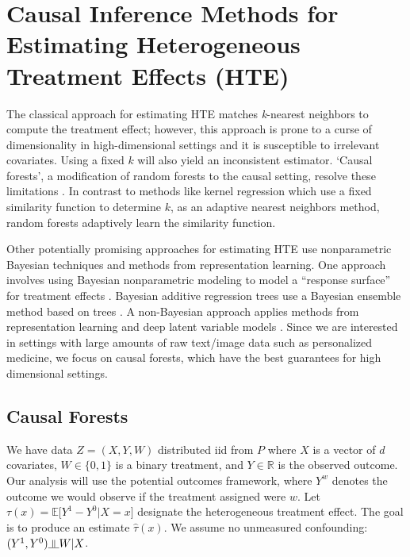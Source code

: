\documentclass{article}
\newcommand{\indep}{\rotatebox[origin=c]{90}{$\models$}}
\begin{document}
\section{Causal Inference Methods for Estimating Heterogeneous Treatment Effects (HTE)}
The classical approach for estimating HTE matches \textit{k}-nearest neighbors to compute the treatment effect; however, this approach is prone to a curse of dimensionality in high-dimensional settings and it is susceptible to irrelevant covariates. Using a fixed $k$ will also yield an inconsistent estimator. `Causal forests', a modification of random forests to the causal setting, resolve these limitations \cite{wager2017estimation}. In contrast to methods like kernel regression which use a fixed similarity function to determine $k$, as an adaptive nearest neighbors method, random forests adaptively learn the similarity function. %

Other potentially promising approaches for estimating HTE use nonparametric Bayesian techniques and methods from representation learning. One approach involves using Bayesian nonparametric modeling to model a ``response surface'' for treatment effects \cite{hill2011bayesian, green2012modeling}. Bayesian additive regression trees use a Bayesian ensemble method based on trees \cite{chipman2010bart}. A non-Bayesian approach applies methods from representation learning and deep latent variable models \cite{shalit2017estimating} \cite{louizos2017causal}. Since we are interested in settings with large amounts of raw text/image data such as personalized medicine, we focus on causal forests, which have the best guarantees for high dimensional settings.
\subsection{Causal Forests}
We have data $Z = (X, Y, W)$ distributed iid from $P$ where $X$ is a vector of $d$ covariates, $W \in \{0,1\}$ is a binary treatment, and $Y \in \mathbb{R}$ is the observed outcome. Our analysis will use the potential outcomes framework, where $Y^w$ denotes the outcome we would observe if the treatment assigned were $w$. 
Let $\tau(x) = \mathbb{E} \big[ Y^1 - Y^0 |X = x]$ designate the heterogeneous treatment effect. The goal is to produce an estimate $\hat{\tau}(x)$. 
We assume no unmeasured confounding: $(Y^1, Y^0) \indep W | X$.
\end{document}
